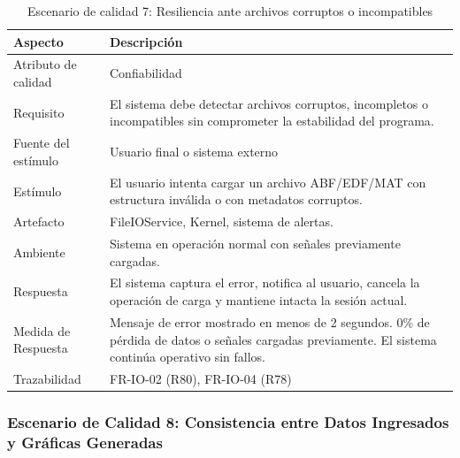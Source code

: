 \documentclass[11pt,a4paper]{article}
\DeclareRobustCommand{\_}{\textunderscore\allowbreak}
\begin{document}
\begin{table}[H]
\centering
\caption{Escenario de calidad 7: Resiliencia ante archivos corruptos o incompatibles}
\label{tab:escenario7}
\begin{tabularx}{\textwidth}{|l|X|}
\hline
\textbf{Aspecto} & \textbf{Descripción} \\
\hline
Atributo de calidad & Confiabilidad \\
\hline
Requisito & El sistema debe detectar archivos corruptos, incompletos o incompatibles sin comprometer la estabilidad del programa. \\
\hline
Fuente del estímulo & Usuario final o sistema externo \\
\hline
Estímulo & El usuario intenta cargar un archivo ABF/EDF/MAT con estructura inválida o con metadatos corruptos. \\
\hline
Artefacto & FileIOService, Kernel, sistema de alertas. \\
\hline
Ambiente & Sistema en operación normal con señales previamente cargadas. \\
\hline
Respuesta & El sistema captura el error, notifica al usuario, cancela la operación de carga y mantiene intacta la sesión actual. \\
\hline
Medida de Respuesta & Mensaje de error mostrado en menos de 2 segundos. 0\% de pérdida de datos o señales cargadas previamente. El sistema continúa operativo sin fallos. \\
\hline
Trazabilidad & FR-IO-02 (R80), FR-IO-04 (R78)  \\
\hline
\end{tabularx}
\end{table}

\subsubsection{Escenario de Calidad 8: Consistencia entre Datos Ingresados y Gráficas Generadas}
\end{document}
